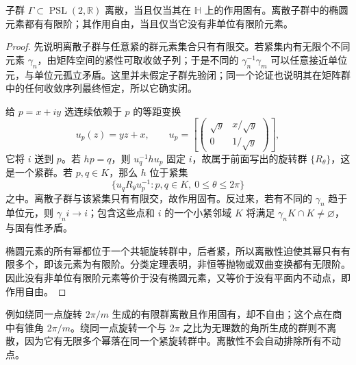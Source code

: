 \begin{proposition}\label{g1:prop:discrete-hyperbolic-action}
	子群 \(\Gamma\subset\operatorname{PSL}(2,\mathbb R)\) 离散，当且仅当其在 \(\mathbb H\) 上的作用固有。离散子群中的椭圆元素都有有限阶；其作用自由，当且仅当它没有非单位有限阶元素。
\end{proposition}
\begin{proof}
	先说明离散子群与任意紧的群元素集合只有有限交。若紧集内有无限个不同元素 \(\gamma_n\)，由矩阵空间的紧性可取收敛子列；于是不同的 \(\gamma_n^{-1}\gamma_m\) 可以任意接近单位元，与单位元孤立矛盾。这里并未假定子群先验闭；同一个论证也说明其在矩阵群中的任何收敛序列最终恒定，所以它确实闭。

	给 \(p=x+iy\) 选连续依赖于 \(p\) 的等距变换
	\[
		u_p(z)=yz+x,\qquad
		u_p=\left[\begin{pmatrix}\sqrt y&x/\sqrt y\\0&1/\sqrt y\end{pmatrix}\right],
	\]
	它将 \(i\) 送到 \(p\)。若 \(h p=q\)，则 \(u_q^{-1}hu_p\) 固定 \(i\)，故属于前面写出的旋转群 \(\{R_\theta\}\)，这是一个紧群。若 \(p,q\in K\)，那么 \(h\) 位于紧集
	\[
		\{u_qR_\theta u_p^{-1}:p,q\in K,\ 0\le\theta\le2\pi\}
	\]
	之中。离散子群与该紧集只有有限交，故作用固有。反过来，若有不同的 \(\gamma_n\) 趋于单位元，则 \(\gamma_ni\to i\)；包含这些点和 \(i\) 的一个小紧邻域 \(K\) 将满足 \(\gamma_nK\cap K\ne\varnothing\)，与固有性矛盾。

	椭圆元素的所有幂都位于一个共轭旋转群中，后者紧，所以离散性迫使其幂只有有限多个，即该元素为有限阶。分类定理表明，非恒等抛物或双曲变换都有无限阶。因此没有非单位有限阶元素等价于没有椭圆元素，又等价于没有平面内不动点，即作用自由。
\end{proof}

例如绕同一点旋转 \(2\pi/m\) 生成的有限群离散且作用固有，却不自由；这个点在商中有锥角 \(2\pi/m\)。绕同一点旋转一个与 \(2\pi\) 之比为无理数的角所生成的群则不离散，因为它有无限多个幂落在同一个紧旋转群中。离散性不会自动排除所有不动点。

